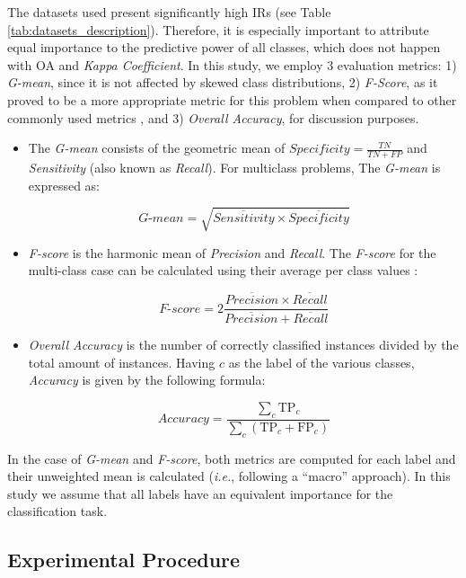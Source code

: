 \documentclass[information,article,submit,moreauthors,pdftex]{Definitions/mdpi}
\begin{document}
\begin{paracol}{2}
The datasets used present significantly high IRs (see Table
\ref{tab:datasets_description}). Therefore, it is especially important to
attribute equal importance to the predictive power of all classes, which does
not happen with OA and \textit{Kappa Coefficient}. In this study, we employ 3
evaluation metrics: 1) \textit{G-mean}, since it is not affected by skewed class
distributions, 2) \textit{F-Score}, as it proved to be a more appropriate metric
for this problem when compared to other commonly used metrics \citep{Jeni2013},
and 3) \textit{Overall Accuracy}, for discussion purposes.

\begin{itemize}
    \item The \textit{G-mean} consists of the geometric mean of $Specificity =
        \frac{TN}{TN + FP}$ and \textit{Sensitivity} (also known as
        \textit{Recall}). For multiclass problems, The \textit{G-mean} is
        expressed as:

        $$\textit{G-mean} = \sqrt{ \overline{Sensitivity} \times
        \overline{Specificity}}$$

    \item \textit{F-score} is the harmonic mean of \textit{Precision} and
        \textit{Recall}. The \textit{F-score} for the multi-class case can be
        calculated using their average per class values \citep{He2009}:

          $$\textit{F-score}=2\frac{\overline{Precision} \times
          \overline{Recall}}{\overline{Precision} + \overline{Recall}}$$

    \item \textit{Overall Accuracy} is the number of correctly classified
        instances divided by the total amount of instances. Having \( c \) as
        the label of the various classes, \textit{Accuracy} is given by the
        following formula:

	      $$\textit{Accuracy} = \frac{ \sum\limits_{c}{ \text{TP}_{c} } }{
			      \sum\limits_{c}{ (\text{TP}_{c}  + \text{FP}_{c}) } } $$

\end{itemize}

In the case of \textit{G-mean} and \textit{F-score}, both metrics are computed
for each label and their unweighted mean is calculated (\textit{i.e.},
following a ``macro'' approach). In this study we assume that all labels
have an equivalent importance for the classification task.

\subsection{Experimental Procedure}


\end{paracol}
\end{document}
